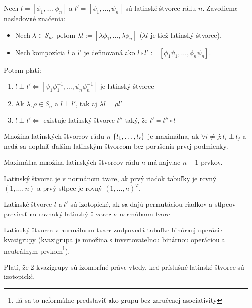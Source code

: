 \begin{theorem}
Nech $l = [\phi_1, \ldots, \phi_n]$ a $l' = [\psi_1, \ldots, \psi_n]$ sú latinské štvorce rádu $n$.
Zavedieme nasledovné značenia:
\begin{itemize}
    \item Nech $\lambda \in S_n$, potom $\lambda l := [\lambda \phi_1, \ldots, \lambda \phi_n]$ ($\lambda l$ je tiež latinský štvorec). 
    \item Nech kompozícia $l$ a $l'$ je definovaná ako $l \circ l' := [\phi_1 \psi_1, \ldots, \phi_n \psi_n]$.
\end{itemize}

Potom platí:

\begin{enumerate}
    \item $l \perp l' \Leftrightarrow [\psi_1 \phi_1^{-1}, \ldots, \psi_n \phi_n^{-1}]$ je latinský štvorec
    \item Ak $\lambda, \rho \in S_n$ a $l \perp l'$,  tak aj $\lambda l \perp \rho l'$
    \item $l \perp l' \Leftrightarrow$ existuje latinský štvorec $l''$ taký, že $l' = l'' \circ l$ 
\end{enumerate}
    
\end{theorem}

\begin{definition}
Množina latinských štvorcov rádu $n$ $\left\{l_1, \ldots, l_r\right\}$ je maximálna, ak $\forall i \neq j: l_i \perp l_j$ a 
nedá sa doplniť ďalším latinským štvorcom bez porušenia prvej podmienky. 
\end{definition}

\begin{theorem}
Maximálna množina latinských štvorcov rádu $n$ má najviac $n-1$ prvkov.
\end{theorem}

\begin{definition}
Latinský štvorec je v normánom tvare, ak prvý riadok tabuľky je rovný $(1, \ldots, n)$ a prvý stlpec je rovný $(1, \ldots, n)^T$.
\end{definition}

\begin{definition}
Latinské štvorce $l$ a $l'$ sú izotopické, ak sa dajú permutáciou riadkov a stlpcov previesť na rovnaký latinský štvorec v normálnom tvare.
\end{definition}

\begin{remark}
Latinský štvorec v normálnom tvare zodpovedá tabuľke binárnej operácie kvazigrupy 
(kvazigrupa je množina s invertovateľnou binárnou operáciou a neutrálnym prvkom\footnote{dá sa to neformálne predstaviť ako grupu bez zaručenej asociativity}).

Platí, že 2 kvazigrupy sú izomorfné práve vtedy, keď príslušné latinské štvorce sú izotopické.
\end{remark}

